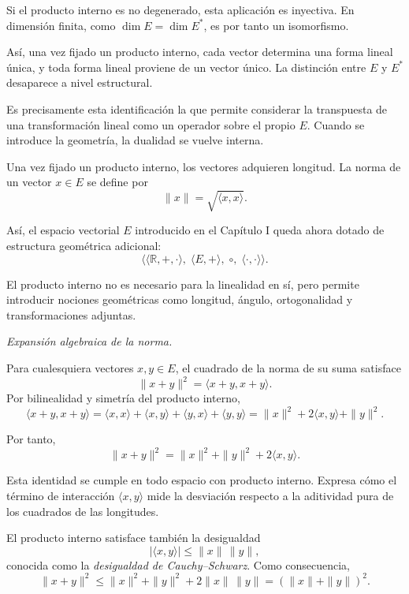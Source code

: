 \medskip

Si el producto interno es no degenerado, esta aplicación es inyectiva.
En dimensión finita, como $\dim E = \dim E^*$, es por tanto un isomorfismo.

\medskip

Así, una vez fijado un producto interno, cada vector determina una forma lineal
única, y toda forma lineal proviene de un vector único.
La distinción entre $E$ y $E^*$ desaparece a nivel estructural.

\medskip

Es precisamente esta identificación la que permite considerar la transpuesta
de una transformación lineal como un operador sobre el propio $E$.
Cuando se introduce la geometría, la dualidad se vuelve interna.

\medskip

Una vez fijado un producto interno, los vectores adquieren longitud.
La norma de un vector $x \in E$ se define por
\[
\|x\| = \sqrt{\langle x,x \rangle}.
\]

\medskip

Así, el espacio vectorial $E$ introducido en el Capítulo I queda ahora dotado
de estructura geométrica adicional:
\[
\Big\langle
\langle \mathbb{R},+,\cdot\rangle,\;
\langle E,+\rangle,\;
\circ,\;
\langle\cdot,\cdot\rangle
\Big\rangle.
\]

El producto interno no es necesario para la linealidad en sí, pero permite
introducir nociones geométricas como longitud, ángulo, ortogonalidad y
transformaciones adjuntas.

\medskip

\textit{Expansión algebraica de la norma.}

Para cualesquiera vectores $x,y \in E$, el cuadrado de la norma de su suma satisface
\[
\|x+y\|^2
=
\langle x+y, x+y \rangle.
\]
Por bilinealidad y simetría del producto interno,
\[
\langle x+y, x+y \rangle
=
\langle x,x \rangle
+
\langle x,y \rangle
+
\langle y,x \rangle
+
\langle y,y \rangle
=
\|x\|^2
+
2\langle x,y \rangle
+
\|y\|^2.
\]

Por tanto,
\[
\|x+y\|^2
=
\|x\|^2
+
\|y\|^2
+
2\langle x,y \rangle.
\]

Esta identidad se cumple en todo espacio con producto interno.
Expresa cómo el término de interacción $\langle x,y \rangle$ mide la
desviación respecto a la aditividad pura de los cuadrados de las longitudes.

\medskip

El producto interno satisface también la desigualdad
\[
|\langle x,y \rangle|
\le
\|x\|\,\|y\|,
\]
conocida como la \emph{desigualdad de Cauchy--Schwarz}.
Como consecuencia,
\[
\|x+y\|^2
\le
\|x\|^2
+
\|y\|^2
+
2\|x\|\,\|y\|
=
(\|x\|+\|y\|)^2.
\]


